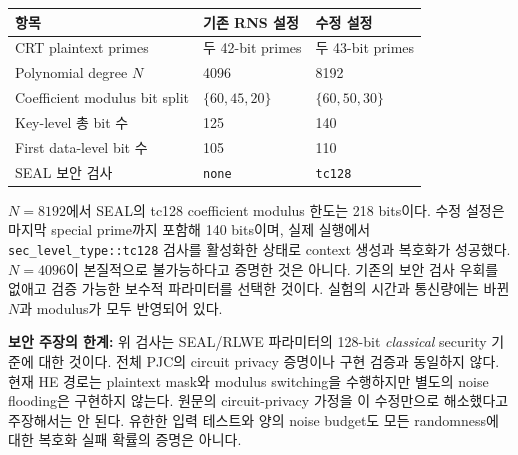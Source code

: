 \documentclass[11pt,a4paper]{article}
\begin{document}
\begin{center}
\begin{tabular}{lll}
\toprule
항목 & 기존 RNS 설정 & 수정 설정\\
\midrule
CRT plaintext primes & 두 42-bit primes & 두 43-bit primes\\
Polynomial degree $N$ & 4096 & 8192\\
Coefficient modulus bit split & $\{60,45,20\}$ & $\{60,50,30\}$\\
Key-level 총 bit 수 & 125 & 140\\
First data-level bit 수 & 105 & 110\\
SEAL 보안 검사 & \texttt{none} & \texttt{tc128}\\
\bottomrule
\end{tabular}
\end{center}

$N=8192$에서 SEAL의 tc128 coefficient modulus 한도는 218 bits이다.
수정 설정은 마지막 special prime까지 포함해 140 bits이며,
실제 실행에서 \texttt{sec\_level\_type::tc128} 검사를 활성화한 상태로 context 생성과 복호화가 성공했다.
$N=4096$이 본질적으로 불가능하다고 증명한 것은 아니다.
기존의 보안 검사 우회를 없애고 검증 가능한 보수적 파라미터를 선택한 것이다.
실험의 시간과 통신량에는 바뀐 $N$과 modulus가 모두 반영되어 있다.

\textbf{보안 주장의 한계:}
위 검사는 SEAL/RLWE 파라미터의 128-bit \emph{classical} security 기준에 대한 것이다.
전체 PJC의 circuit privacy 증명이나 구현 검증과 동일하지 않다.
현재 HE 경로는 plaintext mask와 modulus switching을 수행하지만 별도의 noise flooding은 구현하지 않는다.
원문의 circuit-privacy 가정을 이 수정만으로 해소했다고 주장해서는 안 된다.
유한한 입력 테스트와 양의 noise budget도 모든 randomness에 대한 복호화 실패 확률의 증명은 아니다.
\end{document}
